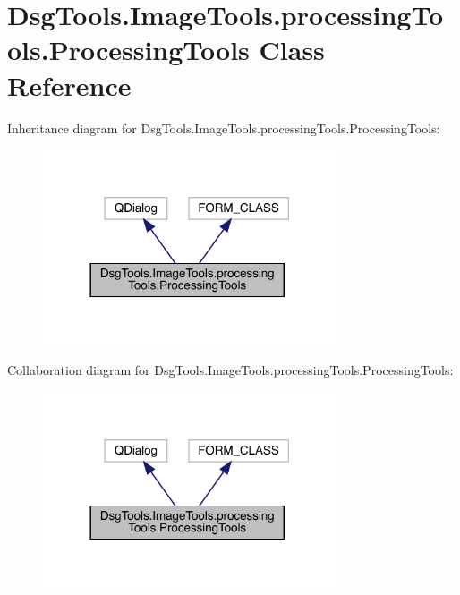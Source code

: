 \hypertarget{class_dsg_tools_1_1_image_tools_1_1processing_tools_1_1_processing_tools}{}\section{Dsg\+Tools.\+Image\+Tools.\+processing\+Tools.\+Processing\+Tools Class Reference}
\label{class_dsg_tools_1_1_image_tools_1_1processing_tools_1_1_processing_tools}


Inheritance diagram for Dsg\+Tools.\+Image\+Tools.\+processing\+Tools.\+Processing\+Tools\+:
\nopagebreak
\begin{figure}[H]
\begin{center}
\leavevmode
\includegraphics[width=246pt]{class_dsg_tools_1_1_image_tools_1_1processing_tools_1_1_processing_tools__inherit__graph}
\end{center}
\end{figure}


Collaboration diagram for Dsg\+Tools.\+Image\+Tools.\+processing\+Tools.\+Processing\+Tools\+:
\nopagebreak
\begin{figure}[H]
\begin{center}
\leavevmode
\includegraphics[width=246pt]{class_dsg_tools_1_1_image_tools_1_1processing_tools_1_1_processing_tools__coll__graph}
\end{center}
\end{figure}
